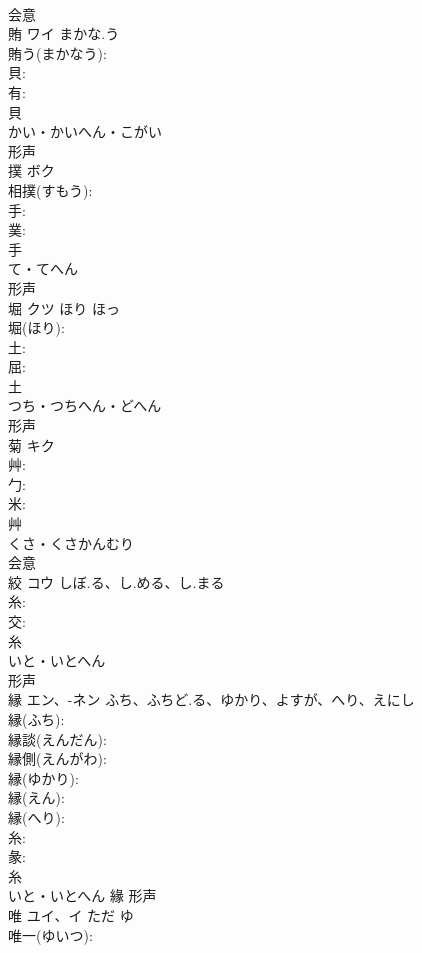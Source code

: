 \documentclass[8pt]{extreport}
\begin{document}
\begin{CJK}{UTF8}{min}
\\	会意 
\\	賄	ワイ	まかな.う		
\\	賄う(まかなう): 
\\	貝: 
\\	有: 
\\	貝	
\\	かい・かいへん・こがい	
\\	形声 
\\	撲	ボク			
\\	相撲(すもう): 
\\	手: 
\\	菐: 
\\	手	
\\	て・てへん	
\\	形声 
\\	堀	クツ	ほり	ほっ	
\\	堀(ほり): 
\\	土: 
\\	屈: 
\\	土	
\\	つち・つちへん・どへん	
\\	形声 
\\	菊	キク			
\\	艸: 
\\	勹: 
\\	米: 
\\	艸	
\\	くさ・くさかんむり	
\\	会意 
\\	絞	コウ	しぼ.る、し.める、し.まる		
\\	糸: 
\\	交: 
\\	糸	
\\	いと・いとへん	
\\	形声 
\\	縁	エン、-ネン	ふち、ふちど.る、ゆかり、よすが、へり、えにし		
\\	縁(ふち): 
\\	縁談(えんだん): 
\\	縁側(えんがわ): 
\\	縁(ゆかり): 
\\	縁(えん): 
\\	縁(へり): 
\\	糸: 
\\	彖: 
\\	糸	
\\	いと・いとへん	緣	形声 
\\	唯	ユイ、イ	ただ	ゆ	
\\	唯一(ゆいつ): 

\end{CJK}
\end{document}
